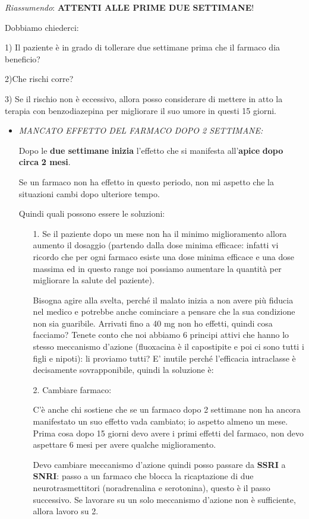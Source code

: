 \emph{Riassumendo}: \textbf{ATTENTI ALLE PRIME DUE SETTIMANE}!

Dobbiamo chiederci:

1) Il paziente è in grado di tollerare due settimane prima che il
farmaco dia beneficio?

2)Che rischi corre?

3) Se il rischio non è eccessivo, allora posso considerare di mettere in
atto la terapia con benzodiazepina per migliorare il suo umore in questi
15 giorni.

\begin{itemize}
\item
  \emph{MANCATO EFFETTO DEL FARMACO DOPO 2 SETTIMANE:}

Dopo le \textbf{due settimane} \textbf{inizia} l'effetto che si
manifesta all'\textbf{apice} \textbf{dopo circa} \textbf{2 mesi}.

Se un farmaco non ha effetto in questo periodo, non mi aspetto che la
situazioni cambi dopo ulteriore tempo.

Quindi quali possono essere le soluzioni:

\begin{itemize}
\item[1.]
  Se il paziente dopo un mese non ha il minimo miglioramento allora
  aumento il dosaggio (partendo dalla dose minima efficace: infatti vi
  ricordo che per ogni farmaco esiste una dose minima efficace e una
  dose massima ed in questo range noi possiamo aumentare la quantità per
  migliorare la salute del paziente).

Bisogna agire alla svelta, perché il malato inizia a non avere più
fiducia nel medico e potrebbe anche cominciare a pensare che la sua
condizione non sia guaribile. Arrivati fino a 40 mg non ho effetti,
quindi cosa facciamo? Tenete conto che noi abbiamo 6 principi attivi che
hanno lo stesso meccanismo d'azione (fluoxacina è il capostipite e poi
ci sono tutti i figli e nipoti): li proviamo tutti? E' inutile perché
l'efficacia intraclasse è decisamente sovrapponibile, quindi la
soluzione è:

\item[2.]
  Cambiare farmaco:

C'è anche chi sostiene che se un farmaco dopo 2 settimane non ha ancora
manifestato un suo effetto vada cambiato; io aspetto almeno un mese.
Prima cosa dopo 15 giorni devo avere i primi effetti del farmaco, non
devo aspettare 6 mesi per avere qualche miglioramento.

Devo cambiare meccanismo d'azione quindi posso passare da \textbf{SSRI}
a \textbf{SNRI}: passo a un farmaco che blocca la ricaptazione di due
neurotrasmettitori (noradrenalina e serotonina), questo è il passo
successivo. Se lavorare su un solo meccanismo d'azione non è
sufficiente, allora lavoro su 2.


\end{itemize}
\end{itemize}
